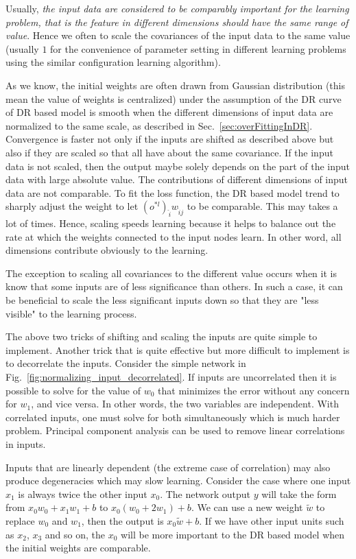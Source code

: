 \documentclass[runningheads,openany]{xhlPaper}
\begin{document}
Usually, \emph{the input data are considered to be comparably important for the learning problem, that is the feature in different dimensions should have the same range of value}. 
Hence we often to scale the covariances of the input data to the same value (usually $1$ for the convenience of parameter setting in different learning problems using the similar configuration learning algorithm).

As we know, the initial weights are often drawn from Gaussian distribution (this mean the value of weights is centralized) under the assumption of the DR curve of DR based model is smooth when the different dimensions of input data are normalized to the same scale, as described in Sec.~\ref{sec:overFittingInDR}.
Convergence is faster not only if the inputs are shifted as described above but also if they are scaled so that all have about the same covariance.
If the input data is not scaled, then the output maybe solely depends on the part of the input data with large absolute value. The contributions of different dimensions of input data are not comparable.
To fit the loss function, the DR based model trend to sharply adjust the weight to let ${{{\left( {{o^{*l}}} \right)}_{\hat i}}{w_{\hat ij}}}$ to be comparable.
This may takes a lot of times. 
Hence, scaling speeds learning because it helps to balance out the rate at which the weights connected to the input nodes learn.
In other word, all dimensions contribute obviously to the learning.

The exception to scaling all covariances to the different value occurs when it is know that some inputs are of less significance than others.
In such a case, it can be beneficial to scale the less significant inputs down so that they are "less visible" to the learning process.

The above two tricks of shifting and scaling the inputs are quite simple to implement.
Another trick that is quite effective but more difficult to implement is to decorrelate the inputs.
Consider the simple network in Fig.~\ref{fig:normalizing_input_decorrelated}.
If inputs are uncorrelated then it is possible to solve for the value of $w_{0}$ that minimizes the error without any concern for $w_{1}$, and vice versa.
In other words, the two variables are independent.
With correlated inputs, one must solve for both simultaneously which is much harder problem.
Principal component analysis can be used to remove linear correlations in inputs.

Inputs that are linearly dependent (the extreme case of correlation) may also produce degeneracies which may slow learning.
Consider the case where one input $x_{1}$ is always twice the other input $x_{0}$. The network output $y$ will take the form from ${x_0}{w_0} + {x_1}{w_1} + b$ to ${x_0}\left( {{w_0} + 2{w_1}} \right) + b$.
We can use a new weight ${\tilde w}$ to replace $w_0$ and $w_1$, then the output is ${x_0} {\tilde w} + b$.
If we have other input units such as $x_2$, $x_3$ and so on, the $x_0$ will be more important to the DR based model when the initial weights are comparable.
\end{document}

